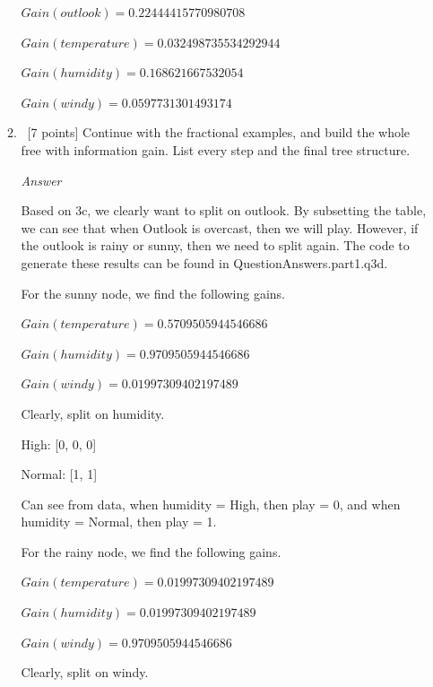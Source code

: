 \documentclass[12pt, fullpage,letterpaper]{article}
\begin{document}
\begin{enumerate}
\begin{enumerate}
\vspace{5mm}

$Gain(outlook)=0.22444415770980708$

$Gain(temperature)=0.032498735534292944$

$Gain(humidity)=0.168621667532054$

$Gain(windy)=0.0597731301493174$

\item~[7 points] Continue with the fractional examples, and build the whole free with information gain. List every step and the final tree structure.

\emph{Answer}

Based on 3c, we clearly want to split on outlook. By subsetting the table, we can see that when Outlook is overcast, then we will play. However, if the outlook is rainy or sunny, then we need to split again. The code to generate these results can be found in QuestionAnswers.part1.q3d.

\vspace{5mm}

For the sunny node, we find the following gains.

$Gain(temperature)=0.5709505944546686$

$Gain(humidity)=0.9709505944546686$

$Gain(windy)=0.01997309402197489$

Clearly, split on humidity.

\vspace{5mm}

High: [0, 0, 0]

Normal: [1, 1]

\vspace{5mm}

Can see from data, when humidity = High, then play = 0, and when humidity = Normal, then play = 1.

\vspace{5mm}

For the rainy node, we find the following gains.

$Gain(temperature)=0.01997309402197489$

$Gain(humidity)=0.01997309402197489$

$Gain(windy)=0.9709505944546686$

\vspace{5mm}

Clearly, split on windy.

\vspace{5mm}


\end{enumerate}
\end{enumerate}
\end{document}
